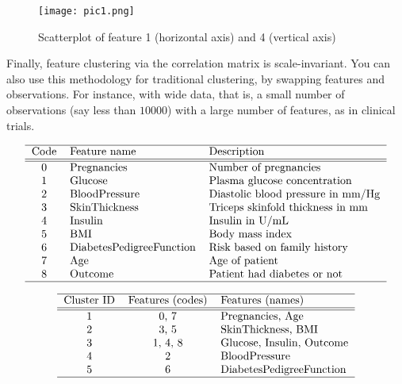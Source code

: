 \documentclass[oneside,10pt]{book}
\renewcommand{\arraystretch}{1.4} %
\begin{document}
\begin{figure}[H]
\centering
\texttt{[image: pic1.png]}
\caption{Scatterplot of feature 1 (horizontal axis) and 4 (vertical axis)}
\label{fig:pihggf}
\end{figure}

Finally, feature clustering via the correlation matrix is scale-invariant. You can also use this methodology for traditional clustering, by swapping features and observations. For instance, with
\textcolor{index}{wide data}, that is, a small number of observations (say less than $\num{10000}$) with a large number of features, as in clinical trials.

\renewcommand{\arraystretch}{1.2} %
\renewcommand{\arraystretch}{1.2} %
\begin{table}[H]
\[
\begin{tabular}{cll}
\hline
 Code &  Feature name & Description  \\
\hline
\hline
 0 & Pregnancies & Number of pregnancies \\
 1 & Glucose & Plasma glucose concentration\\
 2 & BloodPressure &  Diastolic blood pressure in mm/Hg \\
 3 & SkinThickness &  Triceps skinfold thickness in mm\\
4 &  Insulin & Insulin in U/mL\\
5 &  BMI & Body mass index \\
6 &  DiabetesPedigreeFunction & Risk based on family history\\
7 & Age & Age of patient\\
8 & Outcome & Patient had diabetes  or not \\
\hline
\end{tabular}
\]
\caption{\label{tabebbphuyfr} Feature mapping table, medical dataset}
\end{table}

\renewcommand{\arraystretch}{1.2} %
\renewcommand{\arraystretch}{1.2} %
\begin{table}[H]
\[
\begin{tabular}{ccl}
\hline
 Cluster ID &  Features (codes) & Features (names)  \\
\hline
\hline
 1 & 0, 7 & Pregnancies, Age   \\
 2 & 3, 5 & SkinThickness, BMI  \\
 3 & 1, 4, 8 & Glucose, Insulin, Outcome  \\
 4 & 2  & BloodPressure  \\
 5 &  6 & DiabetesPedigreeFunction \\
\hline
\end{tabular}
\]
\caption{\label{tabebbph12huy} Feature clusters}
\end{table}
\end{document}
